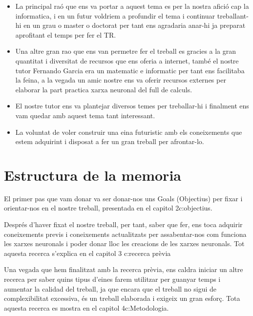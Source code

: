 \begin{itemize}
 \item La principal raó que ens va portar a aquest tema es per la nostra afició cap la informatica, i en un futur voldriem a profundir el tema i continuar treballant-hi en un grau o master o doctorat per tant ens agradaria anar-hi ja preparat aprofitant el temps per fer el TR.

 \item Una altre gran rao que ens van permetre fer el treball es gracies a la gran quantitat i diversitat de  recursos que ens oferia a internet, també el nostre tutor Fernando Garcia era un matematic e informatic per tant ens facilitaba la feina, a la vegada un amic nostre ens va oferir recursos externes per elaborar la part practica xarxa neuronal del full de calculs.

 \item El nostre tutor ens va plantejar diversos temes per treballar-hi i finalment ens vam quedar amb aquest tema tant interessant.

 \item La voluntat de voler construir una eina futuristic amb els coneixements que estem adquirint i disposat a fer un gran treball per afrontar-lo.

\end{itemize}


\section{Estructura de la memoria}

El primer pas que vam donar va ser donar-nos uns Goals (Objectius) per fixar i orientar-nos en el nostre treball, presentada en el capitol 2\refname{c:objectius}.

Després d'haver fixat el nostre treball, per tant, saber que fer, ens toca adquirir coneixements previs i coneixements actualitzats per assabentar-nos com funciona les xarxes neuronals i poder donar lloc les creacions de les xarxes neuronals. Tot aquesta recerca s'explica en el capitol 3 \refname{c:recerca prèvia}

Una vegada que hem finalitzat amb la recerca prèvia, ens caldra iniciar un altre recerca per saber quins tipus d'eines farem utilitzar per guanyar temps i aumentar la calidad del treball, ja que encara que el treball no sigui de complexibilitat excessiva, és un treball elaborada i exigeix un gran esforç. Tota aquesta recerca es mostra en el capitol 4\refname{c:Metodologia}.

